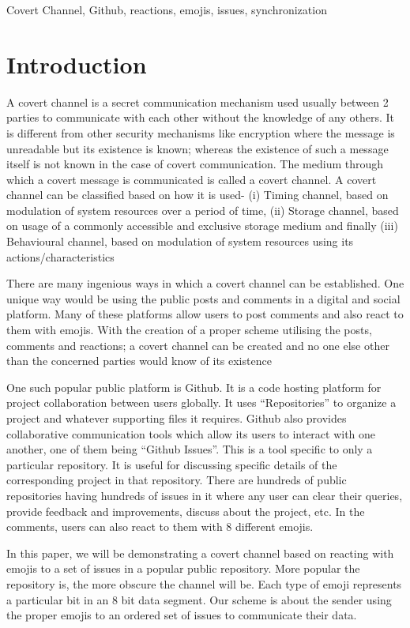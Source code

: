 \documentclass[conference]{IEEEtran}
\begin{document}
\begin{IEEEkeywords}
Covert Channel, Github, reactions, emojis, issues, synchronization

\end{IEEEkeywords}

\section{Introduction}
A covert channel is a secret communication mechanism used usually between 2 parties to communicate with each other without the knowledge of any others. It is different from other security mechanisms like encryption where the message is unreadable but its existence is known; whereas the existence of such a message itself is not known in the case of covert communication. The medium through which a covert message is communicated is called a covert channel. A covert channel can be classified based on how it is used- (i) Timing channel, based on modulation of system resources over a period of time, (ii) Storage channel, based on usage of a commonly accessible and exclusive storage medium and finally (iii) Behavioural channel, based on modulation of system resources using its actions/characteristics

There are many ingenious ways in which a covert channel can be established. One unique way would be using the public posts and comments in a digital and social platform. Many of these platforms allow users to post comments and also react to them with emojis. With the creation of a proper scheme utilising the posts, comments and reactions; a covert channel can be created and no one else other than the concerned parties would know of its existence

One such popular public platform is Github. It is a code hosting platform for project collaboration between users globally. It uses “Repositories” to organize a project and whatever supporting files it requires. Github also provides collaborative communication tools which allow its users to interact with one another, one of them being “Github Issues”. This is a tool specific to only a particular repository. It is useful for discussing specific details of the corresponding project in that repository. There are hundreds of public repositories having hundreds of issues in it where any user can clear their queries, provide feedback and improvements, discuss about the project, etc. In the comments, users can also react to them with 8 different emojis.

In this paper, we will be demonstrating a covert channel based on reacting with emojis to a set of issues in a popular public repository. More popular the repository is, the more obscure the channel will be. Each type of emoji represents a particular bit in an 8 bit data segment. Our scheme is about the sender using the proper emojis to an ordered set of issues to communicate their data. 
\end{document}
